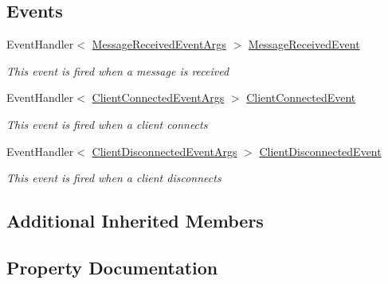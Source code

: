 \subsection*{Events}
\begin{DoxyCompactItemize}
\item 
Event\+Handler$<$ \hyperlink{class_client_server_using_named_pipes_1_1_interfaces_1_1_message_received_event_args}{Message\+Received\+Event\+Args} $>$ \hyperlink{interface_client_server_using_named_pipes_1_1_interfaces_1_1_i_communication_server_a8acf3ca7ac738a4d693beb7efc7fd226}{Message\+Received\+Event}
\begin{DoxyCompactList}\small\item\em This event is fired when a message is received \end{DoxyCompactList}\item 
Event\+Handler$<$ \hyperlink{class_client_server_using_named_pipes_1_1_interfaces_1_1_client_connected_event_args}{Client\+Connected\+Event\+Args} $>$ \hyperlink{interface_client_server_using_named_pipes_1_1_interfaces_1_1_i_communication_server_a4ef1765c48939aec3e6826dc58d9f842}{Client\+Connected\+Event}
\begin{DoxyCompactList}\small\item\em This event is fired when a client connects \end{DoxyCompactList}\item 
Event\+Handler$<$ \hyperlink{class_client_server_using_named_pipes_1_1_interfaces_1_1_client_disconnected_event_args}{Client\+Disconnected\+Event\+Args} $>$ \hyperlink{interface_client_server_using_named_pipes_1_1_interfaces_1_1_i_communication_server_a8efc0f953077379259a43821c7f195ae}{Client\+Disconnected\+Event}
\begin{DoxyCompactList}\small\item\em This event is fired when a client disconnects \end{DoxyCompactList}\end{DoxyCompactItemize}
\subsection*{Additional Inherited Members}


\subsection{Property Documentation}
\mbox{\label{interface_client_server_using_named_pipes_1_1_interfaces_1_1_i_communication_server_a228f8ff6706a75110542feb9790d68e1}} 
